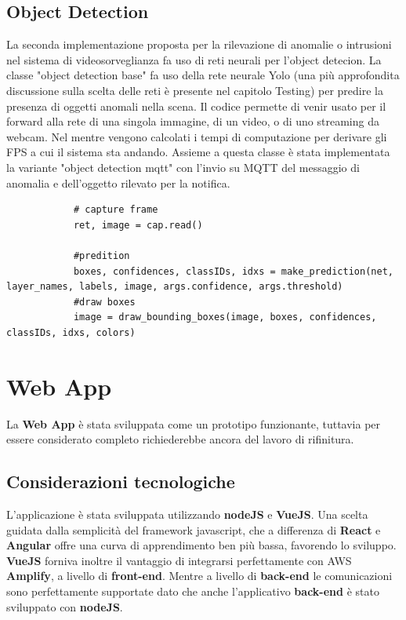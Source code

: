 \subsection{Object Detection}
La seconda implementazione proposta per la rilevazione di anomalie o intrusioni nel sistema di videosorveglianza fa uso di reti neurali per l'object detecion. 
La classe "object detection base" fa uso della rete neurale Yolo (una più approfondita discussione sulla scelta delle reti è presente nel capitolo Testing) per predire la presenza di oggetti anomali nella scena.
Il codice permette di venir usato per il forward alla rete di una singola immagine, di un video, o di uno streaming da webcam. Nel mentre vengono calcolati i tempi di computazione per derivare gli FPS a cui il sistema sta andando.
Assieme a questa classe è stata implementata la variante "object detection mqtt" con l'invio su MQTT del messaggio di anomalia e dell'oggetto rilevato per la notifica.

    \begin{lstlisting}
            # capture frame
            ret, image = cap.read()

            #predition
            boxes, confidences, classIDs, idxs = make_prediction(net, layer_names, labels, image, args.confidence, args.threshold)
            #draw boxes
            image = draw_bounding_boxes(image, boxes, confidences, classIDs, idxs, colors)
    \end{lstlisting}


\section{Web App}

    La \textbf{Web App} è stata sviluppata come un prototipo funzionante, tuttavia per essere considerato completo richiederebbe ancora del lavoro di rifinitura.
    
    \subsection{Considerazioni tecnologiche}
    
        L'applicazione è stata sviluppata utilizzando \textbf{nodeJS} e \textbf{VueJS}. 
        Una scelta guidata dalla semplicità del framework javascript, che a differenza di \textbf{React} e \textbf{Angular} offre una curva di apprendimento ben più bassa, favorendo lo sviluppo. 
        \textbf{VueJS} forniva inoltre il vantaggio di integrarsi perfettamente con AWS \textbf{Amplify}, a livello di \textbf{front-end}.
        Mentre a livello di \textbf{back-end} le comunicazioni sono perfettamente supportate dato che anche l'applicativo \textbf{back-end} è stato sviluppato con \textbf{nodeJS}.
        
